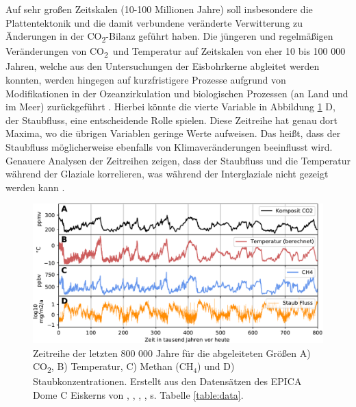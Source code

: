 \documentclass[12pt,a4paper,onecolumn]{scrartcl}
\newcommand{\cotwo}{CO\textsubscript{2}}
\begin{document}
Auf sehr großen Zeitskalen (10-100 Millionen Jahre) soll insbesondere die Plattentektonik und die damit verbundene veränderte Verwitterung zu Änderungen in der \cotwo -Bilanz geführt haben. Die jüngeren und regelmäßigen Veränderungen von \cotwo \ und Temperatur auf Zeitskalen von eher 10 bis 100 000 Jahren, welche aus den Untersuchungen der Eisbohrkerne abgleitet werden konnten, werden hingegen auf kurzfristigere Prozesse aufgrund von Modifikationen in der Ozeanzirkulation und biologischen Prozessen (an Land und im Meer) zurückgeführt \citep{Emerson.2009}. Hierbei könnte die vierte Variable in Abbildung \ref{fig:icecore} D, der Staubfluss, eine entscheidende Rolle spielen. Diese Zeitreihe hat genau dort Maxima, wo die übrigen Variablen geringe Werte aufweisen. Das heißt, dass der Staubfluss möglicherweise ebenfalls von Klimaveränderungen beeinflusst wird. Genauere Analysen der Zeitreihen zeigen, dass der Staubfluss und die Temperatur während der Glaziale korrelieren, was während der Interglaziale nicht gezeigt werden kann \citep{Lambert.2008}.
\begin{figure}[!htb]
\centering
\includegraphics[width=\textwidth]{bilder/epica_icecore.pdf}
\caption{Zeitreihe der letzten 800 000 Jahre für die abgeleiteten Größen A) \cotwo, B) Temperatur, C) Methan (CH$_4$) und D) Staubkonzentrationen. Erstellt aus den Datensätzen des EPICA Dome C Eiskerns von \cite{Jouzel.2007}, \cite{Lambert.2012}, \cite{Loulergue.2008}, \cite{Bereiter.2015}, s. Tabelle \ref{table:data}.}   \label{fig:icecore}
\end{figure}
\end{document}
